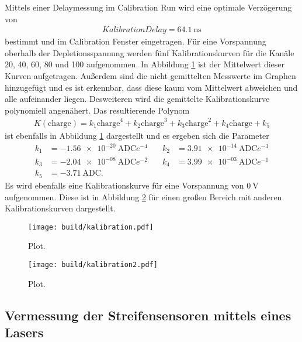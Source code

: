 Mittels einer Delaymessung im Calibration Run wird eine optimale Verzögerung von
\begin{align}
  Kalibration Delay = \SI{64.1}{\nano\second}
\end{align}
bestimmt und im Calibration Fenster eingetragen. Für eine Vorspannung oberhalb der
Depletionsspannung werden fünf Kalibrationskurven für die Kanäle 20, 40, 60, 80 und 100 aufgenommen. In Abbildung \ref{fig:kalibration}
ist der Mittelwert dieser Kurven aufgetragen. Außerdem sind die nicht gemittelten
Messwerte im Graphen hinzugefügt und es ist erkennbar, dass diese kaum vom Mittelwert abweichen und
alle aufeinander liegen. Desweiteren wird die gemittelte Kalibrationskurve polynomiell angenähert.
Das resultierende Polynom
\begin{align}
  K(\text{charge}) = k_1 \text{charge}^4 + k_2 \text{charge}^3 + k_3 \text{charge}^2 + k_4 \text{charge} + k_5
  \label{eqn:kalibrationspolynom}
\end{align}
ist ebenfalls in Abbildung \ref{fig:kalibration} dargestellt und es ergeben sich die Parameter
\begin{align*}
  k_1 &= \SI{-1.56e-20}{\text{ADC}e^{-4}} &\quad k_2 &= \SI{3.91e-14}{\text{ADC}e^{-3}} \\
  k_3 &= \SI{-2.04e-08}{\text{ADC}e^{-2}} &\quad k_4 &= \SI{3.99e-03}{\text{ADC}e^{-1}} \\
  k_5 &= \SI{-3.71}{\text{ADC}}. &\quad \phantom{f}&\phantom{=10}
\end{align*}
Es wird ebenfalls eine Kalibrationskurve für eine Vorspannung von $\SI{0}{\volt}$ aufgenommen. Diese ist in Abbildung
\ref{fig:kalibration2} für einen großen Bereich mit anderen Kalibrationskurven dargestellt.

\begin{figure}
  \centering
  \texttt{[image: build/kalibration.pdf]}
  \caption{Plot.}
  \label{fig:kalibration}
\end{figure}

\begin{figure}
  \centering
  \texttt{[image: build/kalibration2.pdf]}
  \caption{Plot.}
  \label{fig:kalibration2}
\end{figure}

\subsection{Vermessung der Streifensensoren mittels eines Lasers}

